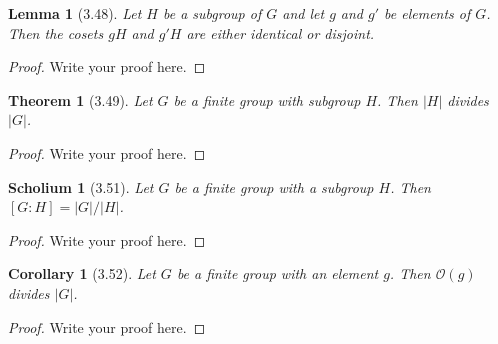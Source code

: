 \documentclass{article}
\newtheorem*{thm}{Theorem}
\newtheorem*{cor}{Corollary}
\newtheorem{lem}{Lemma}
\newtheorem{sch}{Scholium}
\begin{document}
\begin{lem}[3.48]
	Let $H$ be a subgroup of $G$ and let $g$ and $g\prime$ be elements of $G$. Then the cosets $gH$ and $g\prime H$ are either identical or disjoint.

\end{lem}
\begin{proof}
    Write your proof here.
\end{proof}

\begin{thm}[3.49]
	Let $G$ be a finite group with subgroup $H$. Then $|H|$ divides $|G|$.
\end{thm}
\begin{proof}
    Write your proof here.
\end{proof}

\begin{sch}[3.51]
	Let $G$ be a finite group with a subgroup $H$. Then $[G : H] = |G|/|H|$.
\end{sch}
\begin{proof}
    Write your proof here.
\end{proof}

\begin{cor}[3.52]
  Let $G$ be a finite group with an element $g$. Then $\mathcal{O}(g)$ divides $|G|$. 
\end{cor}
\begin{proof}
    Write your proof here.
\end{proof}
\end{document}

